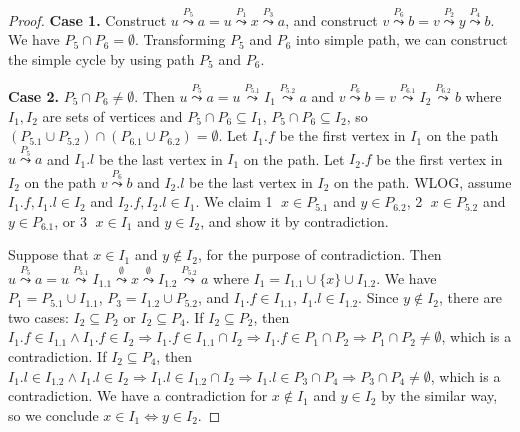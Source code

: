 \begin{proof}
    \textbf{Case 1.}
    Construct
    $u \overset{P_5}{\leadsto} a
    = u \overset{P_1}{\leadsto} x \overset{P_3}{\leadsto} a$,
    and construct
    $v \overset{P_6}{\leadsto} b
    = v \overset{P_2}{\leadsto} y \overset{P_4}{\leadsto} b$.
    We have $P_5 \cap P_6 = \emptyset$.
    Transforming $P_5$ and $P_6$ into simple path,
    we can construct the simple cycle by using path $P_5$ and $P_6$.

    \textbf{Case 2.}
    $P_5 \cap P_6 \neq \emptyset$.
    Then $u \overset{P_5}{\leadsto} a
    = u \overset{P_{5.1}}{\leadsto} I_1 \overset{P_{5.2}}{\leadsto} a$
    and $v \overset{P_6}{\leadsto} b
    = v \overset{P_{6.1}}{\leadsto} I_2 \overset{P_{6.2}}{\leadsto} b$
    where $I_1,I_2$ are sets of vertices 
    and $P_5 \cap P_6 \subseteq I_1$, $P_5 \cap P_6 \subseteq I_2$,
    so $(P_{5.1} \cup P_{5.2}) \cap (P_{6.1} \cup P_{6.2}) = \emptyset$.
    Let $I_1.f$ be the first vertex in $I_1$ on the path $u \overset{P_5}{\leadsto} a$
    and $I_1.l$ be the last vertex in $I_1$ on the path.
    Let $I_2.f$ be the first vertex in $I_2$ on the path $v \overset{P_6}{\leadsto} b$
    and $I_2.l$ be the last vertex in $I_2$ on the path.
    WLOG, assume $I_1.f, I_1.l \in I_2$ and $I_2.f, I_2.l \in I_1$.
    We claim \textcircled{1} $x \in P_{5.1}$ and $y \in P_{6.2}$,
    \textcircled{2} $x \in P_{5.2}$ and $y \in P_{6.1}$,
    or \textcircled{3} $x \in I_1$ and $y \in I_2$, and
    show it by contradiction.
    
    Suppose that $x \in I_1$ and $y \notin I_2$, for the purpose of contradiction.
    Then $u \overset{P_5}{\leadsto} a = u \overset{P_{5.1}}{\leadsto} I_{1.1} 
    \overset{\emptyset}{\leadsto} x \overset{\emptyset}{\leadsto}
    I_{1.2} \overset{P_{5.2}}{\leadsto} a$ where $I_1 = I_{1.1} \cup \{ x \} \cup I_{1.2}$.
    We have $P_1 = P_{5.1} \cup I_{1.1}$, $P_3 = I_{1.2} \cup P_{5.2}$, 
    and $I_1.f \in I_{1.1}$, $I_1.l \in I_{1.2}$.
    Since $y \notin I_2$, there are two cases: $I_2 \subseteq P_2$ or $I_2 \subseteq P_4$.
    If $I_2 \subseteq P_2$, then 
    $I_1.f \in I_{1.1} \wedge I_1.f \in I_2 \Longrightarrow I_1.f \in I_{1.1} \cap I_2
    \Longrightarrow I_1.f \in P_1 \cap P_2
    \Longrightarrow P_1 \cap P_2 \neq \emptyset$,
    which is a contradiction.
    If $I_2 \subseteq P_4$, then 
    $I_1.l \in I_{1.2} \wedge I_1.l \in I_2 \Longrightarrow I_1.l \in I_{1.2} \cap I_2
    \Longrightarrow I_1.l \in P_3 \cap P_4
    \Longrightarrow P_3 \cap P_4 \neq \emptyset$,
    which is a contradiction.
    We have a contradiction for $x \notin I_1$ and $y \in I_2$ by the similar way,
    so we conclude $x \in I_1 \Longleftrightarrow y \in I_2$.


\end{proof}
